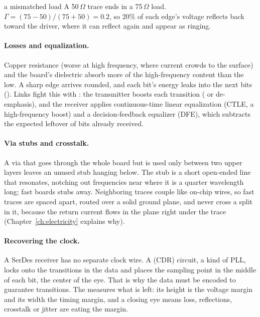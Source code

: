 \begin{worked}{a mismatched load}
A 50\,$\Omega$ trace ends in a 75\,$\Omega$ load. $\Gamma = (75-50)/(75+50) = 0.2$, so 20\% of each edge's voltage reflects back toward the driver, where it can reflect again and appear as ringing.
\end{worked}

\paragraph{Losses and equalization.} Copper resistance (worse at high frequency, where current crowds to the surface) and the board's dielectric absorb more of the high-frequency content than the low. A sharp edge arrives rounded, and each bit's energy leaks into the next bits (). Links fight this with : the transmitter boosts each transition ( or de-emphasis), and the receiver applies continuous-time linear equalization (CTLE, a high-frequency boost) and a decision-feedback equalizer (DFE), which subtracts the expected leftover of bits already received.

\paragraph{Via stubs and crosstalk.} A via that goes through the whole board but is used only between two upper layers leaves an unused stub hanging below. The stub is a short open-ended line that resonates, notching out frequencies near where it is a quarter wavelength long; fast boards  stubs away. Neighboring traces couple like on-chip wires, so fast traces are spaced apart, routed over a solid ground plane, and never cross a split in it, because the return current flows in the plane right under the trace (Chapter~\ref{ch:electricity} explains why).

\paragraph{Recovering the clock.} A SerDes receiver has no separate clock wire. A  (CDR) circuit, a kind of PLL, locks onto the transitions in the data and places the sampling point in the middle of each bit, the center of the eye. That is why the data must be encoded to guarantee transitions. The  measures what is left: its height is the voltage margin and its width the timing margin, and a closing eye means loss, reflections, crosstalk or jitter are eating the margin.

